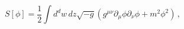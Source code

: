 \begin{equation} \label{scalar action}
S[\phi] = \frac{1}{2} \int d^d w \, dz \sqrt{-g} (g^{\mu \nu} \partial _\mu \phi \partial _\nu \phi +m^2 \phi^2)  \, ,
\end{equation}

